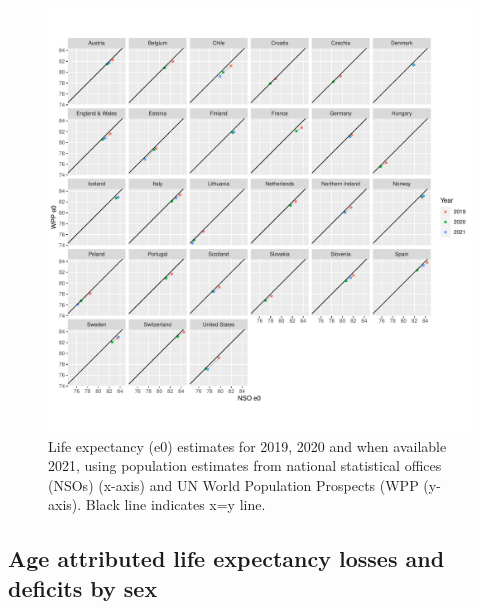 \documentclass[12pt]{article}
\begin{document}
\begin{figure}[ht!]
    \centering
    \includegraphics{E0_compare_v3_2019_21.pdf}
    \caption{Life expectancy (e0) estimates for 2019, 2020 and when available 2021, using population estimates from national statistical offices (NSOs) (x-axis) and UN World Population Prospects (WPP (y-axis). Black line indicates x=y line.}
    \label{fig:e0_compare}
\end{figure}

\clearpage

\subsection*{Age attributed life expectancy losses and deficits by sex}
\end{document}
